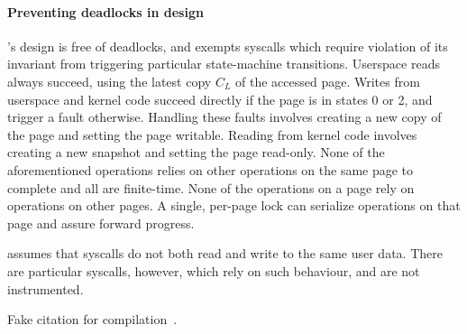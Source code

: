 \documentclass[letterpaper,twocolumn,10pt, anonymous]{article}
\begin{document}
\paragraph{Preventing deadlocks in design}
\tiktok's design is free of deadlocks, and exempts syscalls which 
require violation of its invariant from triggering particular 
state-machine transitions.
Userspace reads always succeed, using the latest copy $C_L$ of the
accessed page.
Writes from userspace and kernel code succeed directly if the 
page is in states 0 or 2, and trigger a fault otherwise.
Handling these faults involves creating a new copy of the page and
setting the page writable. 
Reading from kernel code involves creating a new snapshot and 
setting the page read-only.
None of the aforementioned operations relies on other operations 
on the same page to complete and all are finite-time.
None of the operations on a page rely on operations on other pages.
A single, per-page lock can serialize operations on that page
and assure forward progress.


\tiktok assumes that syscalls do not both read and write to the same user data. 
There are particular syscalls, however, which rely on such behaviour, and 
are not instrumented.


Fake citation for compilation~\cite{silberschatz2018operating}.




\end{document}
